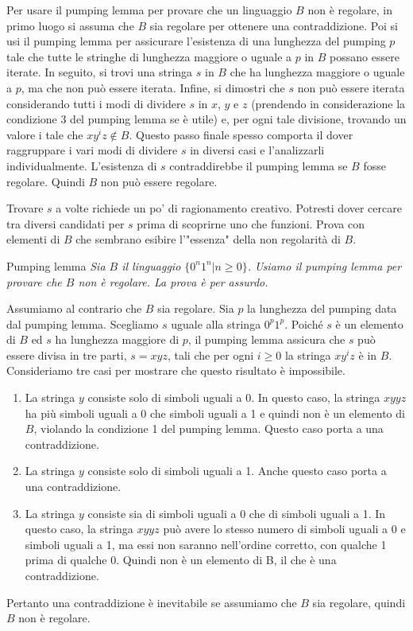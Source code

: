 Per usare il pumping lemma per provare che un linguaggio $B$ non è regolare, in primo luogo si assuma che $B$ sia regolare per ottenere una contraddizione. Poi si usi il pumping lemma per assicurare l'esistenza di una lunghezza del pumping $p$ tale che tutte le stringhe di lunghezza maggiore o uguale a $p$ in $B$ possano essere iterate. In seguito, si trovi una stringa $s$ in $B$ che ha lunghezza maggiore o uguale a $p$, ma che non può essere iterata. Infine, si dimostri che $s$ non può essere iterata considerando tutti i modi di dividere $s$ in $x$, $y$ e $z$ (prendendo in considerazione la condizione 3 del pumping lemma se è utile) e, per ogni tale divisione, trovando un valore i tale che $xy^iz\notin B$. Questo passo finale spesso comporta il dover raggruppare i vari modi di dividere $s$ in diversi casi e l'analizzarli individualmente. L'esistenza di $s$ contraddirebbe il pumping lemma se $B$ fosse regolare. Quindi $B$ non può essere regolare.

Trovare $s$ a volte richiede un po' di ragionamento creativo. Potresti dover cercare tra diversi candidati per $s$ prima di scoprirne uno che funzioni. Prova con elementi di $B$ che sembrano esibire l'"essenza" della non regolarità di $B$.

\begin{Example}{Pumping lemma}{}
\textit{Sia $B$ il linguaggio $\{0^n1^n|n\geq0\}$. Usiamo il pumping lemma per provare che $B$ non è regolare. La prova è per assurdo.}

Assumiamo al contrario che $B$ sia regolare. Sia $p$ la lunghezza del pumping data dal pumping lemma. Scegliamo $s$ uguale alla stringa $0^p1^p$. Poiché $s$ è un elemento di $B$ ed $s$ ha lunghezza maggiore di $p$, il pumping lemma assicura che $s$ può essere divisa in tre parti, $s=xyz$, tali che per ogni $i\geq0$ la stringa $xy^iz$ è in $B$. Consideriamo tre casi per mostrare che questo risultato è impossibile.

\begin{enumerate}
    \item La stringa $y$ consiste solo di simboli uguali a 0. In questo caso, la stringa $xyyz$ ha più simboli uguali a 0 che simboli uguali a 1 e quindi non è un elemento di $B$, violando la condizione 1 del pumping lemma. Questo caso porta a una contraddizione.
    \item La stringa $y$ consiste solo di simboli uguali a 1. Anche questo caso porta a una contraddizione.
    \item La stringa $y$ consiste sia di simboli uguali a 0 che di simboli uguali a 1. In questo caso, la stringa $xyyz$ può avere lo stesso numero di simboli uguali a 0 e simboli uguali a 1, ma essi non saranno nell'ordine corretto, con qualche 1 prima di qualche 0. Quindi non è un elemento di B, il che è una contraddizione.
\end{enumerate}

Pertanto una contraddizione è inevitabile se assumiamo che $B$ sia regolare, quindi $B$ non è regolare.
\end{Example}

